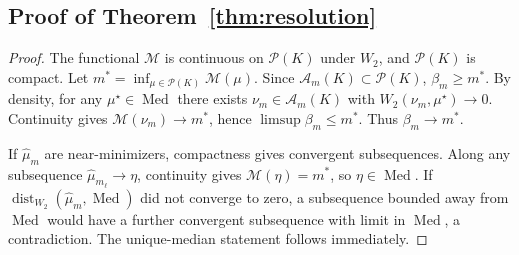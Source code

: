 \documentclass[pdflatex,sn-mathphys-ay]{sn-jnl}%
\theoremstyle{thmstyleone}%
\theoremstyle{thmstyletwo}%
\theoremstyle{thmstylethree}%
\newcommand{\calP}{\mathcal P}
\newcommand{\calM}{\mathcal M}
\newcommand{\calA}{\mathcal A}
\newcommand{\Med}{\operatorname{Med}}
\newcommand{\dist}{\operatorname{dist}}
\begin{document}
\begin{appendices}
\subsection{Proof of Theorem~\ref{thm:resolution}}
\begin{proof}
The functional \(\calM\) is continuous on \(\calP(K)\) under \(W_2\), and \(\calP(K)\) is compact. Let \(m^*=\inf_{\mu\in\calP(K)}\calM(\mu)\). Since \(\calA_m(K)\subset\calP(K)\), \(\beta_m\ge m^*\). By density, for any \(\mu^\star\in\Med\) there exists \(\nu_m\in\calA_m(K)\) with \(W_2(\nu_m,\mu^\star)\to0\). Continuity gives \(\calM(\nu_m)\to m^*\), hence \(\limsup\beta_m\le m^*\). Thus \(\beta_m\to m^*\).

If \(\hat\mu_m\) are near-minimizers, compactness gives convergent subsequences. Along any subsequence \(\hat\mu_{m_\ell}\to\eta\), continuity gives \(\calM(\eta)=m^*\), so \(\eta\in\Med\). If \(\dist_{W_2}(\hat\mu_m,\Med)\) did not converge to zero, a subsequence bounded away from \(\Med\) would have a further convergent subsequence with limit in \(\Med\), a contradiction. The unique-median statement follows immediately.
\end{proof}

\end{appendices}

\end{document}
